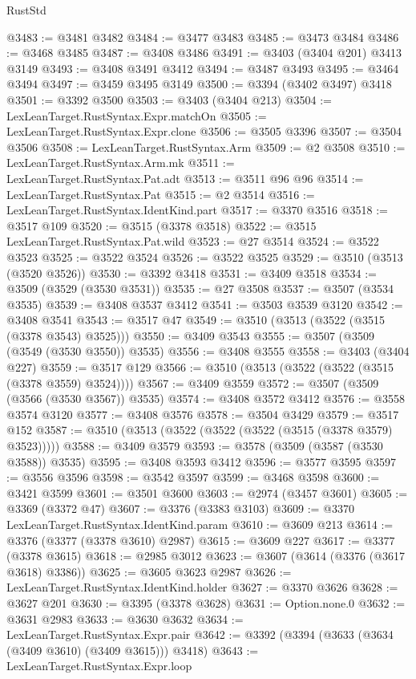 \begin{lexlean}{RustStd}
\begin{coremodule}
@3483 := @3481 @3482
@3484 := @3477 @3483
@3485 := @3473 @3484
@3486 := @3468 @3485
@3487 := @3408 @3486
@3491 := @3403 (@3404 @201) @3413 @3149
@3493 := @3408 @3491 @3412
@3494 := @3487 @3493
@3495 := @3464 @3494
@3497 := @3459 @3495 @3149
@3500 := @3394 (@3402 @3497) @3418
@3501 := @3392 @3500
@3503 := @3403 (@3404 @213)
@3504 := LexLeanTarget.RustSyntax.Expr.matchOn
@3505 := LexLeanTarget.RustSyntax.Expr.clone
@3506 := @3505 @3396
@3507 := @3504 @3506
@3508 := LexLeanTarget.RustSyntax.Arm
@3509 := @2 @3508
@3510 := LexLeanTarget.RustSyntax.Arm.mk
@3511 := LexLeanTarget.RustSyntax.Pat.adt
@3513 := @3511 @96 @96
@3514 := LexLeanTarget.RustSyntax.Pat
@3515 := @2 @3514
@3516 := LexLeanTarget.RustSyntax.IdentKind.part
@3517 := @3370 @3516
@3518 := @3517 @109
@3520 := @3515 (@3378 @3518)
@3522 := @3515 LexLeanTarget.RustSyntax.Pat.wild
@3523 := @27 @3514
@3524 := @3522 @3523
@3525 := @3522 @3524
@3526 := @3522 @3525
@3529 := @3510 (@3513 (@3520 @3526))
@3530 := @3392 @3418
@3531 := @3409 @3518
@3534 := @3509 (@3529 (@3530 @3531))
@3535 := @27 @3508
@3537 := @3507 (@3534 @3535)
@3539 := @3408 @3537 @3412
@3541 := @3503 @3539 @3120
@3542 := @3408 @3541
@3543 := @3517 @47
@3549 := @3510 (@3513 (@3522 (@3515 (@3378 @3543) @3525)))
@3550 := @3409 @3543
@3555 := @3507 (@3509 (@3549 (@3530 @3550)) @3535)
@3556 := @3408 @3555
@3558 := @3403 (@3404 @227)
@3559 := @3517 @129
@3566 := @3510 (@3513 (@3522 (@3522 (@3515 (@3378 @3559) @3524))))
@3567 := @3409 @3559
@3572 := @3507 (@3509 (@3566 (@3530 @3567)) @3535)
@3574 := @3408 @3572 @3412
@3576 := @3558 @3574 @3120
@3577 := @3408 @3576
@3578 := @3504 @3429
@3579 := @3517 @152
@3587 := @3510 (@3513 (@3522 (@3522 (@3522 (@3515 (@3378 @3579) @3523)))))
@3588 := @3409 @3579
@3593 := @3578 (@3509 (@3587 (@3530 @3588)) @3535)
@3595 := @3408 @3593 @3412
@3596 := @3577 @3595
@3597 := @3556 @3596
@3598 := @3542 @3597
@3599 := @3468 @3598
@3600 := @3421 @3599
@3601 := @3501 @3600
@3603 := @2974 (@3457 @3601)
@3605 := @3369 (@3372 @47)
@3607 := @3376 (@3383 @3103)
@3609 := @3370 LexLeanTarget.RustSyntax.IdentKind.param
@3610 := @3609 @213
@3614 := @3376 (@3377 (@3378 @3610) @2987)
@3615 := @3609 @227
@3617 := @3377 (@3378 @3615)
@3618 := @2985 @3012
@3623 := @3607 (@3614 (@3376 (@3617 @3618) @3386))
@3625 := @3605 @3623 @2987
@3626 := LexLeanTarget.RustSyntax.IdentKind.holder
@3627 := @3370 @3626
@3628 := @3627 @201
@3630 := @3395 (@3378 @3628)
@3631 := Option.none.{0}
@3632 := @3631 @2983
@3633 := @3630 @3632
@3634 := LexLeanTarget.RustSyntax.Expr.pair
@3642 := @3392 (@3394 (@3633 (@3634 (@3409 @3610) (@3409 @3615))) @3418)
@3643 := LexLeanTarget.RustSyntax.Expr.loop

\end{coremodule}
\end{lexlean}
